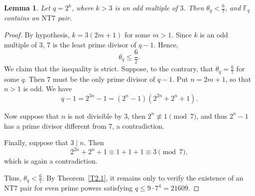 \documentclass[10pt,a4paper]{amsart}
\newtheorem{lemma}{Lemma}
\begin{document}
\begin{lemma}\label{L2.3}
Let $q=2^k$, where $k>3$ is an odd multiple of $3$. Then $\theta_q<\frac{6}{7}$, and $\mathbb{F}_q$ contains an $\mathrm{NT}7$ pair.
\end{lemma}

\begin{proof}
By hypothesis, $k=3(2m+1)$ for some $m> 1$. Since $k$ is an odd multiple of $3$, $7$ is the least prime divisor of $q-1$. Hence,
\[
\theta_q
\leq\frac{6}{7}.
\]
We claim that the inequality is strict. Suppose, to the contrary, that $\theta_q=\frac{6}{7}$ for some $q$.
Then $7$ must be the only prime divisor of $q-1$. Put $n=2m+1$, so that $n>1$ is odd. We have
\[
q-1=2^{3n}-1
=(2^n-1)(2^{2n}+2^n+1).
\]

Now suppose that $n$ is not divisible by $3$, then $2^n\not\equiv 1\pmod 7$, and thus $2^n-1$ has a prime divisor different from $7$, a contradiction.

Finally, suppose that $3\mid n$. Then 
\[
2^{2n}+2^n+1\equiv 1+1+1\equiv3\pmod 7,
\]
 which is again a contradiction.

Thus, $\theta_q<\frac{6}{7}$.
By Theorem~\ref{T2.1}, it remains only to verify the existence of an $\mathrm{NT}7$ pair for even prime powers satisfying $q\leq 9\cdot7^4=21609$. 


\end{proof}
\end{document}

